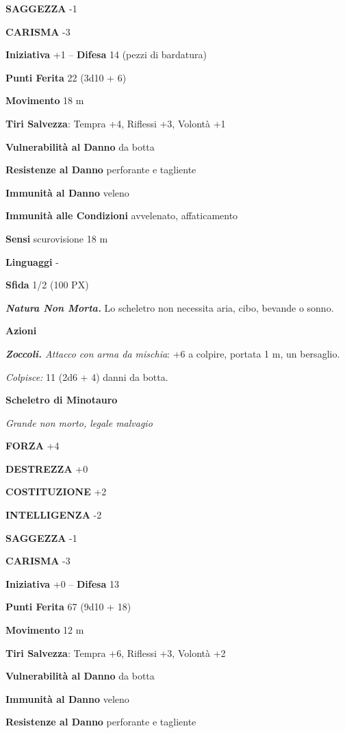 \begin{multicols}{2}
\textbf{SAGGEZZA} -1

\textbf{CARISMA} -3

\textbf{Iniziativa} +1 -- \textbf{Difesa} 14 (pezzi di bardatura)

\textbf{Punti Ferita} 22 (3d10 + 6)

\textbf{Movimento} 18 m

\textbf{Tiri Salvezza}: Tempra +4, Riflessi +3, Volontà +1

\textbf{Vulnerabilità al Danno} da botta

\textbf{Resistenze al Danno} perforante e tagliente

\textbf{Immunità al Danno} veleno

\textbf{Immunità alle Condizioni} avvelenato, affaticamento

\textbf{Sensi} scurovisione 18 m

\textbf{Linguaggi} -

\textbf{Sfida} 1/2 (100 PX)

\textit{\textbf{Natura Non Morta.}} Lo scheletro non necessita aria, cibo, bevande o sonno.

\textbf{Azioni}

\textit{\textbf{Zoccoli.} Attacco con arma da mischia}: +6 a colpire, portata 1 m, un bersaglio.

\textit{Colpisce:} 11 (2d6 + 4) danni da botta.

\medskip{}\textbf{Scheletro di Minotauro}

\textit{Grande non morto, legale malvagio}

\textbf{FORZA} +4

\textbf{DESTREZZA} +0

\textbf{COSTITUZIONE} +2

\textbf{INTELLIGENZA} -2

\textbf{SAGGEZZA} -1

\textbf{CARISMA} -3

\textbf{Iniziativa} +0 -- \textbf{Difesa} 13

\textbf{Punti Ferita} 67 (9d10 + 18)

\textbf{Movimento} 12 m

\textbf{Tiri Salvezza}: Tempra +6, Riflessi +3, Volontà +2

\textbf{Vulnerabilità al Danno} da botta

\textbf{Immunità al Danno} veleno

\textbf{Resistenze al Danno} perforante e tagliente


\end{multicols}
